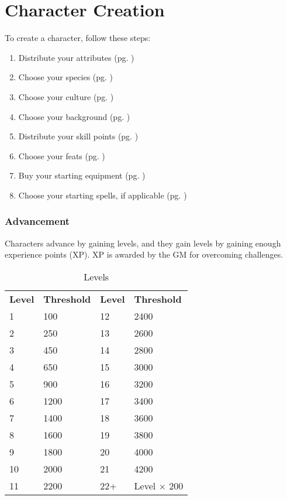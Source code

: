 \chapter{Character Creation}\label{character-creation}

\begin{multicols}{2}
    To create a character, follow these steps:
    \begin{enumerate}
        \item Distribute your attributes (pg. \pageref{attributes})
        \item Choose your species (pg. \pageref{species})
        \item Choose your culture (pg. \pageref{culture})
        \item Choose your background (pg. \pageref{background})
        \item Distribute your skill points (pg. \pageref{skills})
        \item Choose your feats (pg. \pageref{feats})
        \item Buy your starting equipment (pg. \pageref{equipment})
        \item Choose your starting spells, if applicable (pg. \pageref{magic})
    \end{enumerate}

    \subsection{Advancement}
    Characters advance by gaining levels, and they gain levels by gaining enough
    experience points (XP). XP is awarded by the GM for overcoming challenges.
    \begin{table*}[ht]
        \unclassedrowcolors
        \begin{tabularx}{\textwidth}{l X l X}
            \textbf{Level} & \textbf{Threshold} & \textbf{Level} & \textbf{Threshold} \\
            1 & 100 & 12 & 2400 \\
            2 & 250 & 13 & 2600 \\
            3 & 450 & 14 & 2800 \\
            4 & 650 & 15 & 3000 \\
            5 & 900 & 16 & 3200 \\
            6 & 1200 & 17 & 3400 \\
            7 & 1400 & 18 & 3600 \\
            8 & 1600 & 19 & 3800 \\
            9 & 1800 & 20 & 4000 \\
            10 & 2000 & 21 & 4200 \\
            11 & 2200 & 22+ & Level $\times$ 200 \\
        \end{tabularx}
        \caption{Levels}
        \label{tab:levels}
    \end{table*}


\end{multicols}
